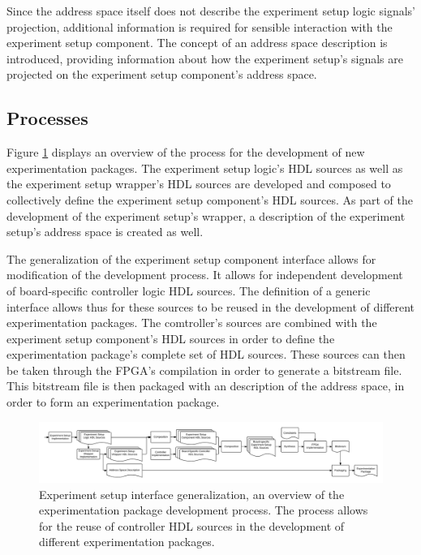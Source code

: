 \documentclass[main.tex]{subfiles}
\begin{document}
Since the address space itself does not describe the experiment setup logic signals' projection, additional information is required for sensible interaction with the experiment setup component. The concept of an address space description is introduced, providing information about how the experiment setup's signals are projected on the experiment setup component's address space. 

\subsection{Processes}
Figure \ref{fig:processes-abstract-development} displays an overview of the process for the development of new experimentation packages. The experiment setup logic's HDL sources as well as the experiment setup wrapper's HDL sources are developed and composed to collectively define the experiment setup component's HDL sources. As part of the development of the experiment setup's wrapper, a description of the experiment setup's address space is created as well. 

The generalization of the experiment setup component interface allows for modification of the development process. It allows for independent development of board-specific controller logic HDL sources. The definition of a generic interface allows thus for these sources to be reused in the development of different experimentation packages. The comtroller's sources are combined with the experiment setup component's HDL sources in order to define the experimentation package's complete set of HDL sources. These sources can then be taken through the FPGA's compilation in order to generate a bitstream file. This bitstream file is then packaged with an description of the address space, in order to form an experimentation package.

\begin{figure}[h]
    \caption{ Experiment setup interface generalization, an overview of the experimentation package development process. The process allows for the reuse of controller HDL sources in the development of different experimentation packages.}
    \label{fig:processes-abstract-development}
    \centering
    \includegraphics[width=\textwidth]{img/processes-abstract-development}
\end{figure}
\end{document}
